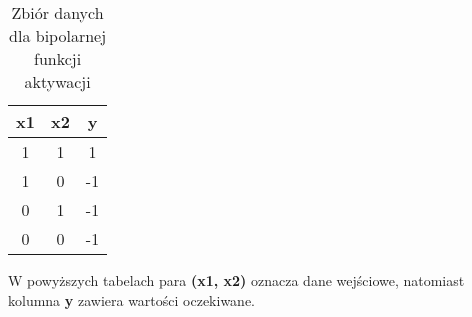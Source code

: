 \documentclass[../main.tex]{subfiles}
\begin{document}
        \begin{table}[h]
    \centering
    \begin{tabular}{|| c | c | c ||}
    \hline
    x1 & x2 & y \\ \hline
    1  & 1  & 1 \\
    1  & 0  & -1 \\
    0  & 1  & -1 \\
    0  & 0  & -1 \\ \hline
    \end{tabular}
    \caption{Zbiór danych dla bipolarnej funkcji aktywacji}
    \label{dataset_unipolar:1}
    \end{table}
    
    W powyższych tabelach para \textbf{(x1, x2)} oznacza dane wejściowe, natomiast kolumna \textbf{y} zawiera wartości oczekiwane.
\end{document}
